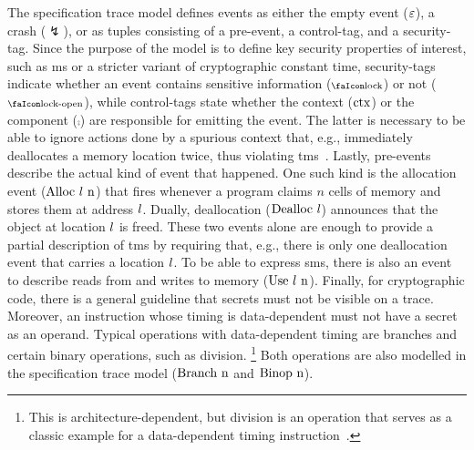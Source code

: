 \documentclass[dvipsnames]{llncs}
\begin{document}
The specification trace model defines events as either the empty event ($\varepsilon$), a crash ($\lightning$), or as tuples consisting of a pre-event, a control-tag, and a security-tag.
Since the purpose of the model is to define key security properties of interest, such as \gls*{ms} or a stricter variant of cryptographic constant time, security-tags indicate whether an event contains sensitive information ($\lock$) or not ($\unlock$), while control-tags state whether the context ($\text{ctx}$) or the component ($\comp$) are responsible for emitting the event.
The latter is necessary to be able to ignore actions done by a spurious context that, e.g., immediately deallocates a memory location twice, thus violating \gls*{tms}~\cite{nagarakatte2010cets}.
Lastly, pre-events describe the actual kind of event that happened.
One such kind is the allocation event ($\text{Alloc\ \ensuremath l\ n}$) that fires whenever a program claims $n$ cells of memory and stores them at address $l$.
Dually, deallocation ($\text{Dealloc\ \ensuremath l}$) announces that the object at location $l$ is freed.
These two events alone are enough to provide a partial description of \gls*{tms} by requiring that, e.g., there is only one deallocation event that carries a location $l$.
To be able to express \gls*{sms}, there is also an event to describe reads from and writes to memory ($\text{Use\ \ensuremath l\ n}$).
Finally, for cryptographic code, there is a general guideline that secrets must not be visible on a trace.
Moreover, an instruction whose timing is data-dependent must not have a secret as an operand.
Typical operations with data-dependent timing are branches and certain binary operations, such as division.%
\footnote{
	This is architecture-dependent, but division is an operation that serves as a classic example for a data-dependent timing instruction~\cite[p.~755]{arm-refman}.
}
Both operations are also modelled in the specification trace model ($\ev{Branch\ n}$ and $\text{Binop\ n}$).
\end{document}
